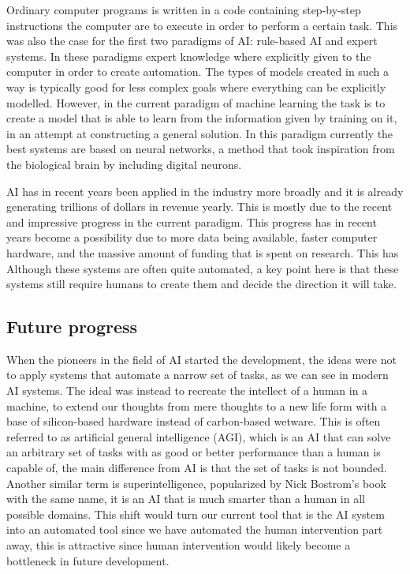 \documentclass[12pt,A4]{report}
\theoremstyle{definition}
\begin{document}
Ordinary computer programs is written in a code containing step-by-step instructions the computer are to execute in order to perform a certain task. This was also the case for the first two paradigms of AI: rule-based AI and expert systems\autocite{K'lla}. In these paradigms expert knowledge where explicitly given to the computer in order to create automation. The types of models created in such a way is typically good for less complex goals where everything can be explicitly modelled. However, in the current paradigm of machine learning the task is to create a model that is able to learn from the information given by training on it, in an attempt at constructing a general solution\autocite{K'lla}. In this paradigm currently the best systems are based on neural networks, a method that took inspiration from the biological brain by including digital neurons. 

AI has in recent years been applied in the industry more broadly and it is already generating trillions of dollars in revenue yearly\autocite{Russel Norving}. This is mostly due to the recent and impressive progress in the current paradigm. This progress has in recent years become a possibility due to more data being available, faster computer hardware, and the massive amount of funding that is spent on research. This has Although these systems are often quite automated, a key point here is that these systems still require humans to create them and decide the direction it will take.


\subsection{Future progress}
When the pioneers in the field of AI started the development, the ideas were not to apply systems that automate a narrow set of tasks, as we can see in modern AI systems. The ideal was instead to recreate the intellect of a human in a machine, to extend our thoughts from mere thoughts to a new life form with a base of silicon-based hardware instead of carbon-based wetware. This is often referred to as artificial general intelligence (AGI), which is an AI that can solve an arbitrary set of tasks with as good or better performance than a human is capable of, the main difference from AI is that the set of tasks is not bounded. Another similar term is superintelligence, popularized by Nick Bostrom's book with the same name, it is an AI that is much smarter than a human in all possible domains. This shift would turn our current tool that is the AI system into an automated tool since we have automated the human intervention part away, this is attractive since human intervention would likely become a bottleneck in future development\autocite{Tänkande maskiner}.  
\end{document}
